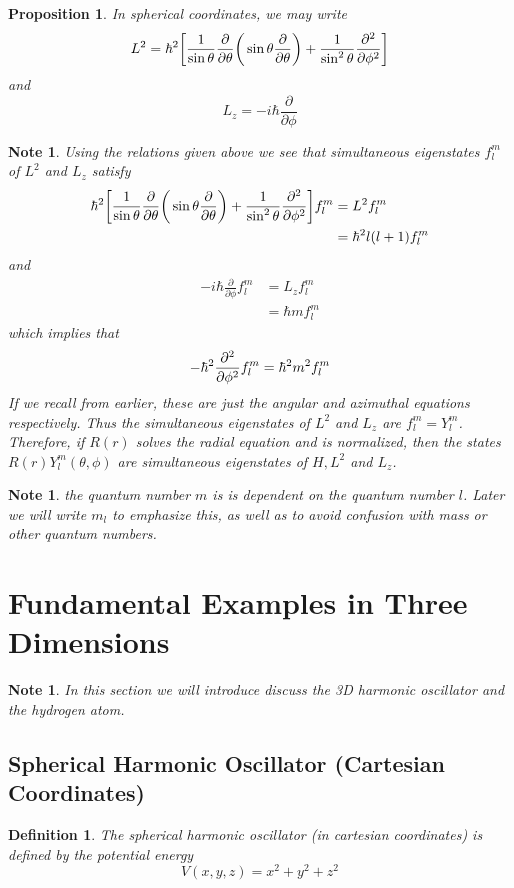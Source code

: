 \documentclass[12pt]{amsart}
\newtheorem{prop}[thm]{Proposition}
\newtheorem{defn}[thm]{Definition}
\newtheorem{note}[thm]{Note}
\newcommand{\p}[1]{\frac{\partial}{\partial{#1}}}
\begin{document}
\begin{prop}
In spherical coordinates, we may write $$L^2 = \hbar^2\bigg[ \frac{1}{\sin \theta }\p{\theta} \bigg( \sin \theta \p{\theta} \bigg) + \frac{1}{\sin^2 \theta} \pdv[2]{}{\phi}\bigg]$$ and $$L_z = -i\hbar \p{\phi}$$
\end{prop}

\begin{note}
Using the relations given above we see that simultaneous eigenstates $f_l^m$ of $L^2$ and $L_z$ satisfy 
\begin{align*}
\hbar^2\bigg[ \frac{1}{\sin \theta }\p{\theta} \bigg( \sin \theta \p{\theta} \bigg) + \frac{1}{\sin^2 \theta} \pdv[2]{}{\phi}\bigg] f_l^m 
&= L^2 f_l^m \\
&= \hbar^2 l(l+1) f_l^m 
\end{align*}
and 
\begin{align*}
-i \hbar \p{\phi} f_l^m 
&= L_z f_l^m \\
&= \hbar m f_l^m 
\end{align*}
which implies that $$-\hbar^2 \pdv[2]{}{\phi}f_l^m  = \hbar^2 m^2 f_l^m $$
If we recall from earlier, these are just the angular and azimuthal equations respectively. Thus the simultaneous eigenstates of $L^2$ and $L_z$ are $f_l^m = Y_l^m$. Therefore, if $R(r)$ solves the radial equation and is normalized, then the states $R(r)Y_l^m(\theta, \phi)$ are simultaneous eigenstates of $H, L^2$ and $L_z$.
\end{note}

\begin{note}
the quantum number $m$ is is dependent on the quantum number $l$. Later we will write $m_l$ to emphasize this, as well as to avoid confusion with mass or other quantum numbers. 
\end{note}
\newpage

\section{Fundamental Examples in Three Dimensions}
\begin{note}
In this section we will introduce discuss the 3D harmonic oscillator and the hydrogen atom.
\end{note}

\subsection{Spherical Harmonic Oscillator (Cartesian Coordinates)}

\begin{defn}
The spherical harmonic oscillator (in cartesian coordinates) is defined by the potential energy
$$V(x,y,z) = x^2 + y^2 + z^2$$
\end{defn}
\end{document}
